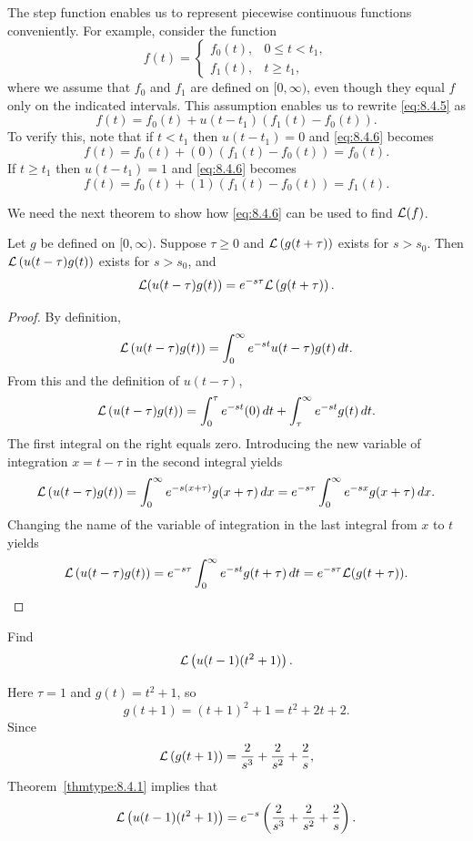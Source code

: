 \documentclass{ximera}
\begin{document}
The step function enables us to represent piecewise continuous
functions conveniently. For example, consider the function
\begin{equation}\label{eq:8.4.5}
f(t)=\left\{\begin{array}{rl}
f_0(t),&0\leq t<t_1,\\
f_1(t),&t\geq t_1,
\end{array}\right.
\end{equation}
where we assume that $f_0$ and $f_1$ are defined on $[0,\infty)$, even
though they equal $f$ only on the indicated intervals. This assumption
enables us to rewrite \eqref{eq:8.4.5} as
\begin{equation}\label{eq:8.4.6}
f(t)=f_0(t)+u(t-t_1)\left(f_1(t)-f_0(t)\right).
\end{equation}
To verify this, note that if $t<t_1$ then $u(t-t_1)=0$ and
\eqref{eq:8.4.6}  becomes
$$
f(t)=f_0(t)+(0)\left(f_1(t)-f_0(t)\right)=f_0(t).
$$
If $t\geq t_1$ then $u(t-t_1)=1$ and  \eqref{eq:8.4.6} becomes
$$
f(t)=f_0(t)+(1)\left(f_1(t)-f_0(t)\right)=f_1(t).
$$

We need the next theorem to
 show how \eqref{eq:8.4.6} can be used to find ${\cal L}(f)$.

\begin{theorem}\label{thmtype:8.4.1}
Let $g$ be defined on $[0,\infty).$ Suppose   $\tau\geq 0$ and ${\cal
L}\left(g(t+\tau)\right)$ exists for $s>s_0.$ Then ${\cal
L}\left(u(t-\tau)g(t)\right)$ exists for $s>s_0$, and
$$
{\cal L}(u(t-\tau)g(t))=e^{-s\tau}{\cal L}\left(g(t+\tau)\right).
$$
\end{theorem}

\begin{proof}
By definition,
$$
{\cal L}\left(u(t-\tau)g(t)\right)=\int_0^\infty e^{-st} u(t-\tau)g(t)\,
dt.
$$
From this and the definition of $u(t-\tau)$,
$$
{\cal L}\left(u(t-\tau)g(t)\right)=\int_0^\tau
e^{-st}(0)\,dt+\int_{\tau}^\infty e^{-st}g(t)\,dt.
$$
The first integral on the right equals zero.  Introducing the new variable
of integration $x=t-\tau$ in the second integral yields
$$
{\cal L}\left(u(t-\tau)g(t)\right)=\int_0^\infty e^{-s(x+\tau)}g(x+\tau)\,dx
=e^{-s\tau}\int_0^\infty e^{-sx} g(x+\tau)\,dx.
$$
Changing the name of the variable of integration in the last integral
from $x$ to $t$ yields
$$
{\cal L}\left(u(t-\tau)g(t)\right)
=e^{-s\tau}\int_0^\infty e^{-st} g(t+\tau)\,dt=e^{-s\tau}{\cal
L}(g(t+\tau)).
$$
\end{proof}

\begin{example}\label{example:8.4.2}
 Find
$$
{\cal L}\left(u(t-1)(t^2+1)\right).
$$
\begin{explanation}
Here $\tau=1$ and $g(t)=t^2+1$, so
$$
g(t+1)=(t+1)^2+1=t^2+2t+2.
$$
Since
$$
{\cal L}\left(g(t+1)\right)=\frac{2}{s^3}+\frac{2}{s^2}+\frac{2}{s},
$$
Theorem~\ref{thmtype:8.4.1} implies that
$${\cal L}\left(u(t-1)(t^2+1)\right)
=e^{-s}\left(\frac{2}{s^3}+\frac{2}{s^2}+\frac{2}{s}\right).
$$
\end{explanation}
\end{example}
\end{document}
